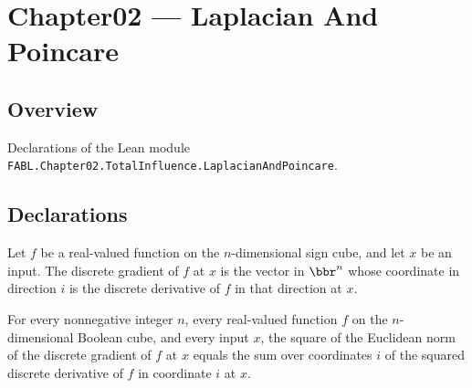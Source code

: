 \chapter{Chapter02 — Laplacian And Poincare}
\section{Overview}

Declarations of the Lean module \texttt{FABL.Chapter02.TotalInfluence.LaplacianAndPoincare}.

\section{Declarations}

\begin{definition}
\label{FABL.discreteGradient}
\leanok
{}
Let $f$ be a real-valued function on the $n$-dimensional sign cube, and let $x$ be an
input. The discrete gradient of $f$ at $x$ is the vector in $\bbr^n$ whose coordinate in
direction $i$ is the discrete derivative of $f$ in that direction at $x$.
\end{definition}

\begin{theorem}
\label{FABL.norm_discreteGradient_sq}
\leanok
{}
For every nonnegative integer $n$, every real-valued function $f$ on the $n$-dimensional
Boolean cube, and every input $x$, the square of the Euclidean norm of the discrete
gradient of $f$ at $x$ equals the sum over coordinates $i$ of the squared discrete
derivative of $f$ in coordinate $i$ at $x$.
\end{theorem}

